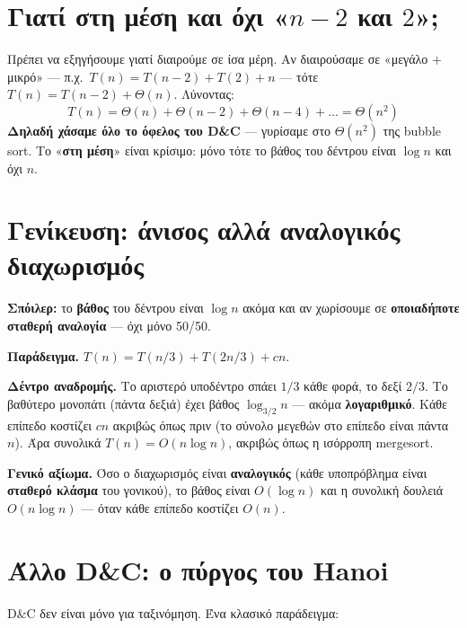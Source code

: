 \documentclass[11pt,a4paper]{article}
\begin{document}
\section{Γιατί στη μέση και όχι «$n-2$ και $2$»;}

Πρέπει να εξηγήσουμε γιατί διαιρούμε σε ίσα μέρη. Αν διαιρούσαμε σε «μεγάλο $+$
μικρό» --- π.χ.\ $T(n) = T(n-2) + T(2) + n$ --- τότε $T(n) = T(n-2) +
\Theta(n)$. Λύνοντας:
\[
T(n) = \Theta(n) + \Theta(n-2) + \Theta(n-4) + \dots = \Theta(n^2)
\]
\textbf{Δηλαδή χάσαμε όλο το όφελος του D\&C} --- γυρίσαμε στο $\Theta(n^2)$ της
bubble sort. Το «\textbf{στη μέση}» είναι κρίσιμο: μόνο τότε το βάθος του δέντρου
είναι $\log n$ και όχι $n$.

\section{Γενίκευση: άνισος αλλά αναλογικός διαχωρισμός}

\textbf{Σπόιλερ:} το \textbf{βάθος} του δέντρου είναι $\log n$ ακόμα και αν
χωρίσουμε σε \textbf{οποιαδήποτε σταθερή αναλογία} --- όχι μόνο 50/50.

\begin{examplebox}
\textbf{Παράδειγμα.} $T(n) = T(n/3) + T(2n/3) + cn$.

\textbf{Δέντρο αναδρομής.} Το αριστερό υποδέντρο σπάει $1/3$ κάθε φορά, το δεξί
$2/3$. Το βαθύτερο μονοπάτι (πάντα δεξιά) έχει βάθος $\log_{3/2} n$ --- ακόμα
\textbf{λογαριθμικό}. Κάθε επίπεδο κοστίζει $cn$ ακριβώς όπως πριν (το σύνολο
μεγεθών στο επίπεδο είναι πάντα $n$). Άρα συνολικά $T(n) = O(n \log n)$, ακριβώς
όπως η ισόρροπη mergesort.
\end{examplebox}

\begin{keypoint}
\textbf{Γενικό αξίωμα.} Όσο ο διαχωρισμός είναι \textbf{αναλογικός} (κάθε
υποπρόβλημα είναι \textbf{σταθερό κλάσμα} του γονικού), το βάθος είναι $O(\log n)$
και η συνολική δουλειά $O(n \log n)$ --- όταν κάθε επίπεδο κοστίζει $O(n)$.
\end{keypoint}

\section{Άλλο D\&C: ο πύργος του Hanoi}

D\&C δεν είναι μόνο για ταξινόμηση. Ένα κλασικό παράδειγμα:
\end{document}
